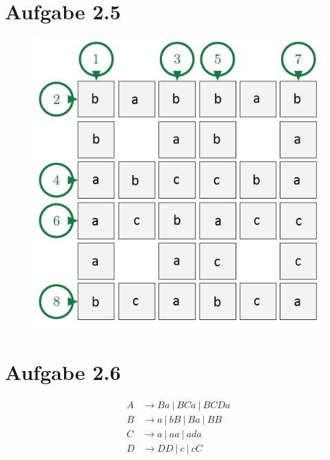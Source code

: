 \documentclass{article}
\begin{document}
\newpage
\section{Aufgabe 2.5}
\begin{figure}[h]
  \includegraphics[width=\textwidth]{crossword.png}
\end{figure}

\section{Aufgabe 2.6}
\begin{align*}
A &\rightarrow Ba\ |\ BCa\ |\ BCDa \\
B &\rightarrow a\  |\ bB\  |\ Ba\  |\ BB \\ %
C &\rightarrow a\  |\ aa\  |\ ada  \\
D &\rightarrow DD\ |\ c\   |\ cC   
\end{align*}
\end{document}
